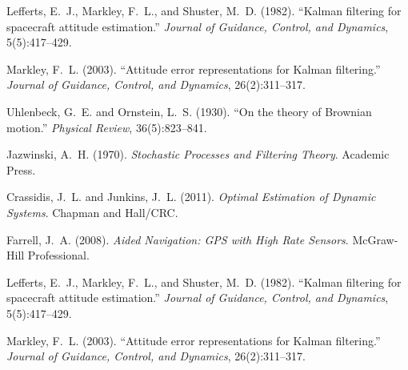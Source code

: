 \documentclass[11pt,letterpaper]{article}
\begin{document}
\begin{thebibliography}{20}
Lefferts, E.~J., Markley, F.~L., and Shuster, M.~D. (1982). 
``Kalman filtering for spacecraft attitude estimation.'' 
\emph{Journal of Guidance, Control, and Dynamics}, 5(5):417--429.

Markley, F.~L. (2003). 
``Attitude error representations for Kalman filtering.'' 
\emph{Journal of Guidance, Control, and Dynamics}, 26(2):311--317.

Uhlenbeck, G.~E. and Ornstein, L.~S. (1930).
``On the theory of Brownian motion.''
\emph{Physical Review}, 36(5):823--841.

Jazwinski, A.~H. (1970). 
\emph{Stochastic Processes and Filtering Theory}. 
Academic Press.

Crassidis, J.~L. and Junkins, J.~L. (2011).
\emph{Optimal Estimation of Dynamic Systems}.
Chapman and Hall/CRC.

Farrell, J.~A. (2008).
\emph{Aided Navigation: GPS with High Rate Sensors}.
McGraw-Hill Professional.

Lefferts, E.~J., Markley, F.~L., and Shuster, M.~D. (1982). 
``Kalman filtering for spacecraft attitude estimation.'' 
\emph{Journal of Guidance, Control, and Dynamics}, 5(5):417--429.

Markley, F.~L. (2003). 
``Attitude error representations for Kalman filtering.'' 
\emph{Journal of Guidance, Control, and Dynamics}, 26(2):311--317.


\end{thebibliography}
\end{document}
